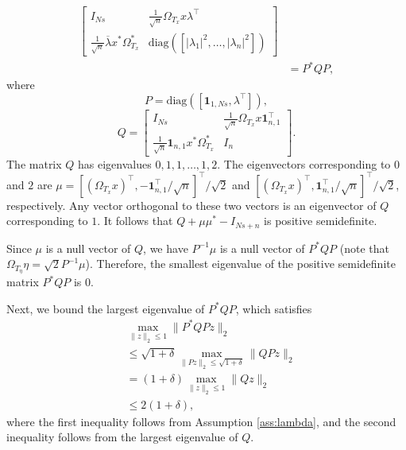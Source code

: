 \documentclass[11pt,journal]{IEEEtran}
\newcommand{\norm}[1]{\|{#1}\|}
\newcommand{\T}{\top}
\newcommand{\diag}{\mathrm{diag}}
\begin{document}
\begin{IEEEproof}
\begin{align*}
\begin{bmatrix}
I_{Ns} & \frac{1}{\sqrt{n}} \Omega_{T_x} x \lambda^\T \\
\frac{1}{\sqrt{n}}  \overline{\lambda}x^* \Omega_{T_x}^*  & \diag([|\lambda_1|^2, \dots, |\lambda_n|^2])
\end{bmatrix} \\
& = P^*QP,
\end{align*}
where
\[
P = \diag([\bm{1}_{1,Ns},\lambda^\T]),
\]
\[
Q = \begin{bmatrix}
I_{Ns} & \frac{1}{\sqrt{n}} \Omega_{T_x} x \bm{1}_{n,1}^\T \\
\frac{1}{\sqrt{n}}  \bm{1}_{n,1} x^* \Omega_{T_x}^*  & I_n
\end{bmatrix}.
\]
The matrix $Q$ has eigenvalues $0, 1, 1, \dots, 1, 2$. The eigenvectors corresponding to $0$ and $2$ are $\mu = [(\Omega_{T_x} x)^\T, -\bm{1}_{n,1}^\T/\sqrt{n}]^\T/\sqrt{2}$ and $[(\Omega_{T_x} x)^\T, \bm{1}_{n,1}^\T/\sqrt{n}]^\top/\sqrt{2}$, respectively. Any vector orthogonal to these two vectors is an eigenvector of $Q$ corresponding to $1$. It follows that $ Q + \mu\mu^* - I_{Ns+n} $ is positive semidefinite.

Since $\mu$ is a null vector of $Q$, we have $P^{-1}\mu$ is a null vector of $P^*QP$ (note that $\Omega_{T_\eta}\eta = \sqrt{2}P^{-1}\mu$). Therefore, the smallest eigenvalue of the positive semidefinite matrix $P^*QP$ is $0$.

Next, we bound the largest eigenvalue of $P^*QP$, which satisfies
\begin{align}
\nonumber & \max_{\norm{z}_2\leq 1} \norm{P^*QPz}_2 \\
\nonumber & \leq \sqrt{1+\delta}\max_{\norm{Pz}_2\leq \sqrt{1+\delta}} \norm{QPz}_2 \\
\nonumber & = (1+\delta)\max_{\norm{z}_2\leq 1} \norm{Qz}_2 \\
\label{eq:max_amp} & \leq 2(1+\delta),
\end{align}
where the first inequality follows from Assumption \ref{ass:lambda}, and the second inequality follows from the largest eigenvalue of $Q$.


\end{IEEEproof}
\end{document}
